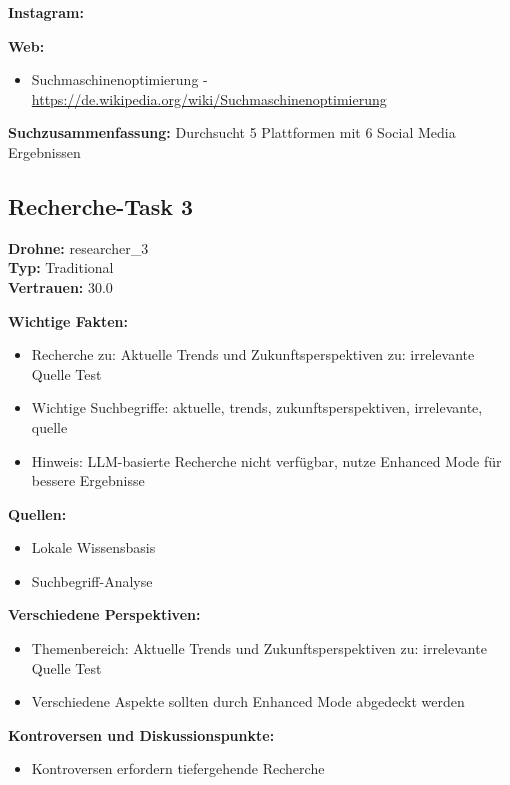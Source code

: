 \documentclass[12pt,a4paper]{article}
\begin{document}
\textbf{Instagram:}
\begin{itemize}
\end{itemize}

\textbf{Web:}
\begin{itemize}
\item Suchmaschinenoptimierung - \url{https://de.wikipedia.org/wiki/Suchmaschinenoptimierung}
\end{itemize}

\textbf{Suchzusammenfassung:} Durchsucht 5 Plattformen mit 6 Social Media Ergebnissen

\subsection{Recherche-Task 3}

\textbf{Drohne:} researcher\_3\\
\textbf{Typ:} Traditional\\
\textbf{Vertrauen:} 30.0%

\textbf{Wichtige Fakten:}
\begin{itemize}
\item Recherche zu: Aktuelle Trends und Zukunftsperspektiven zu: irrelevante Quelle Test
\item Wichtige Suchbegriffe: aktuelle, trends, zukunftsperspektiven, irrelevante, quelle
\item Hinweis: LLM-basierte Recherche nicht verfügbar, nutze Enhanced Mode für bessere Ergebnisse
\end{itemize}

\textbf{Quellen:}
\begin{itemize}
\item Lokale Wissensbasis
\item Suchbegriff-Analyse
\end{itemize}

\textbf{Verschiedene Perspektiven:}
\begin{itemize}
\item Themenbereich: Aktuelle Trends und Zukunftsperspektiven zu: irrelevante Quelle Test
\item Verschiedene Aspekte sollten durch Enhanced Mode abgedeckt werden
\end{itemize}

\textbf{Kontroversen und Diskussionspunkte:}
\begin{itemize}
\item Kontroversen erfordern tiefergehende Recherche
\end{itemize}
\end{document}
